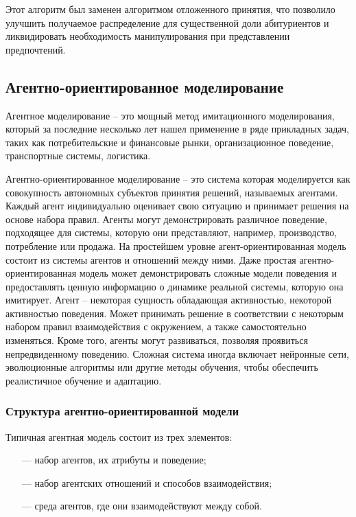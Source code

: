 Этот алгоритм был заменен алгоритмом отложенного принятия, что позволило улучшить
получаемое распределение для существенной доли абитуриентов и ликвидировать необходимость манипулирования при представлении предпочтений.


\subsection{Агентно-ориентированное моделирование}

Агентное моделирование – это мощный метод имитационного моделирования, который за последние несколько лет нашел применение в ряде прикладных задач, таких как потребительские и финансовые рынки, организационное поведение, транспортные системы, логистика.

Агентно-ориентированное моделирование – это система которая моделируется как совокупность автономных субъектов принятия решений, называемых агентами.
Каждый агент индивидуально оценивает свою ситуацию и принимает решения на основе набора правил. Агенты могут демонстрировать различное поведение,
подходящее для системы, которую они представляют, например, производство, потребление или продажа. На простейшем уровне агент-ориентированная модель состоит из системы агентов и отношений между ними. Даже простая агентно-ориентированная модель может демонстрировать сложные модели поведения и предоставлять ценную информацию о динамике реальной системы, которую она имитирует. 
Агент – некоторая сущность обладающая активностью, некоторой активностью поведения. Может принимать решение в соответствии с некоторым набором правил взаимодействия с окружением, а также самостоятельно изменяться. Кроме того, агенты могут развиваться, позволяя проявиться непредвиденному поведению. Сложная система иногда включает нейронные сети, эволюционные алгоритмы или другие методы обучения, чтобы обеспечить реалистичное обучение и адаптацию.

\subsubsection{Структура агентно-ориентированной модели}

Типичная агентная модель состоит из трех элементов:

\begin{itemize}[leftmargin=1.6\parindent]
	\item[---] набор агентов, их атрибуты и поведение;
	\item[---] набор агентских отношений и способов взаимодействия;
	\item[---] среда агентов, где они взаимодействуют между собой.

\end{itemize}


